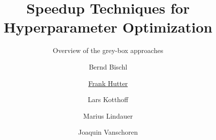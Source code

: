 %


%


\title[AutoML: Grey-box Approaches]{Speedup Techniques for Hyperparameter Optimization} %
\subtitle{Overview of the grey-box approaches} %
\author[Marius Lindauer]{Bernd Bischl \and \underline{Frank Hutter} \and Lars Kotthoff\newline \and Marius Lindauer \and Joaquin Vanschoren}
\institute{}
\date{}




	
\maketitle
%


	


%




